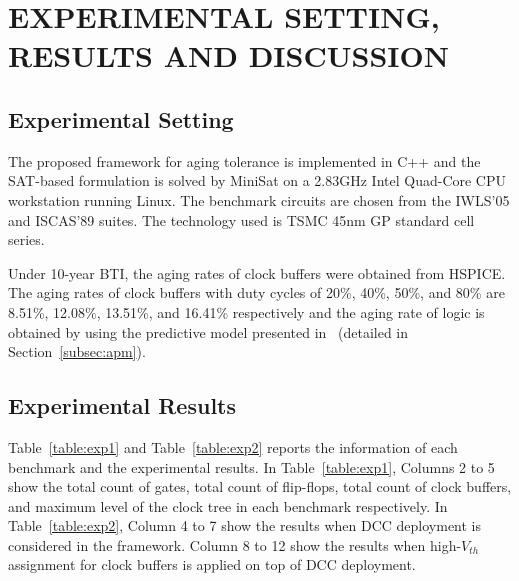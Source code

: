 \section{EXPERIMENTAL SETTING, RESULTS AND DISCUSSION}
\label{sec:exp}
\subsection{Experimental Setting}
The proposed framework for aging tolerance is implemented in C++ and the SAT-based formulation is solved by MiniSat on a 2.83GHz Intel Quad-Core CPU workstation running Linux. The benchmark circuits are chosen from the IWLS'05 and ISCAS'89 suites. The technology used is TSMC 45nm GP standard cell series.

Under 10-year BTI, the aging rates of clock buffers were obtained from HSPICE. The aging rates of clock buffers with duty cycles of 20\%, 40\%, 50\%, and 80\% are 8.51\%, 12.08\%, 13.51\%, and 16.41\% respectively and the aging rate of logic is obtained by using the predictive model presented in~\cite{wang2010impact, wang2007efficient, gomez2016early, amrouch2016reliability} (detailed in Section~\ref{subsec:apm}).


\subsection{Experimental Results}
Table~\ref{table:exp1} and Table~\ref{table:exp2} reports the information of each benchmark and the experimental results. In Table~\ref{table:exp1}, Columns 2 to 5 show the total count of gates, total count of flip-flops, total count of clock buffers, and maximum level of the clock tree in each benchmark respectively. In Table~\ref{table:exp2}, Column 4 to 7 show the results when DCC deployment is considered in the framework. Column 8 to 12 show the results when high-$V_{th}$ assignment for clock buffers is applied on top of DCC deployment.

